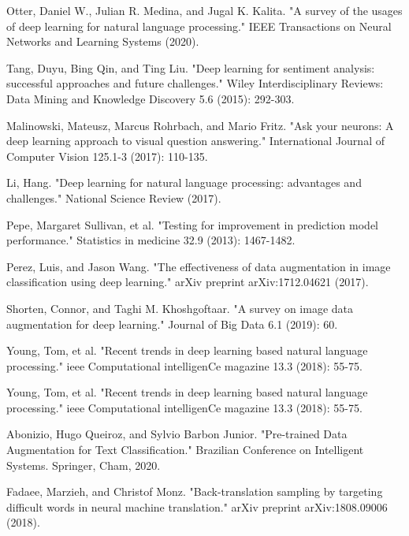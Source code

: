 \documentclass{article}
\begin{document}
\begin{thebibliography}{10}

 Otter, Daniel W., Julian R. Medina, and Jugal K. Kalita. "A survey of the usages of deep learning for natural language processing." IEEE Transactions on Neural Networks and Learning Systems (2020).

 Tang, Duyu, Bing Qin, and Ting Liu. "Deep learning for sentiment analysis: successful approaches and future challenges." Wiley Interdisciplinary Reviews: Data Mining and Knowledge Discovery 5.6 (2015): 292-303.

 Malinowski, Mateusz, Marcus Rohrbach, and Mario Fritz. "Ask your neurons: A deep learning approach to visual question answering." International Journal of Computer Vision 125.1-3 (2017): 110-135.


 Li, Hang. "Deep learning for natural language processing: advantages and challenges." National Science Review (2017).

 Pepe, Margaret Sullivan, et al. "Testing for improvement in prediction model performance." Statistics in medicine 32.9 (2013): 1467-1482.

 Perez, Luis, and Jason Wang. "The effectiveness of data augmentation in image classification using deep learning." arXiv preprint arXiv:1712.04621 (2017).

 Shorten, Connor, and Taghi M. Khoshgoftaar. "A survey on image data augmentation for deep learning." Journal of Big Data 6.1 (2019): 60.

 Young, Tom, et al. "Recent trends in deep learning based natural language processing." ieee Computational intelligenCe magazine 13.3 (2018): 55-75.


 Young, Tom, et al. "Recent trends in deep learning based natural language processing." ieee Computational intelligenCe magazine 13.3 (2018): 55-75.

 Abonizio, Hugo Queiroz, and Sylvio Barbon Junior. "Pre-trained Data Augmentation for Text Classification." Brazilian Conference on Intelligent Systems. Springer, Cham, 2020.

 Fadaee, Marzieh, and Christof Monz. "Back-translation sampling by targeting difficult words in neural machine translation." arXiv preprint arXiv:1808.09006 (2018).


\end{thebibliography}
\end{document}
